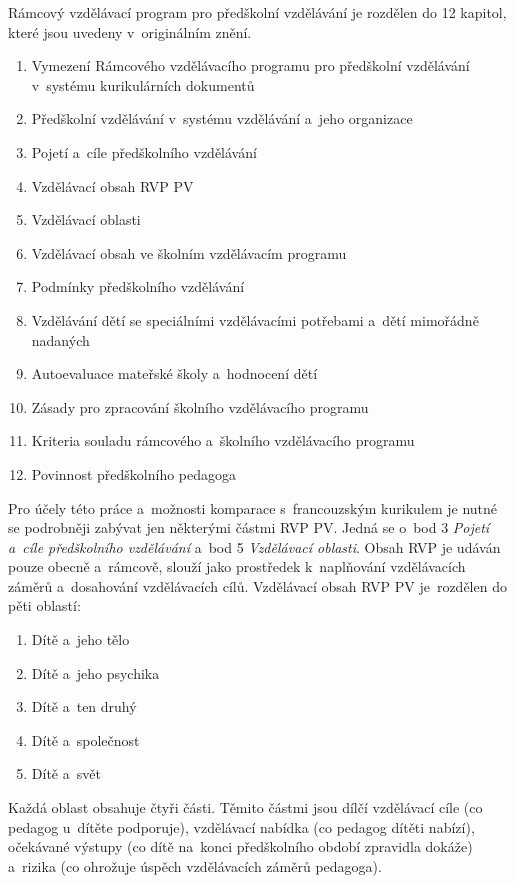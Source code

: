		\break \noindent
		Rámcový vzdělávací program pro předškolní vzdělávání je rozdělen do 12 kapitol, které jsou uvedeny v~originálním znění. \citep[s.~2]{RVP}
		\begin{enumerate}[1]
			\setlength\itemsep{-2mm}

			\item Vymezení Rámcového vzdělávacího programu pro předškolní vzdělávání v systému kurikulárních dokumentů
			\item Předškolní vzdělávání v systému vzdělávání a~jeho organizace
			\item Pojetí a~cíle předškolního vzdělávání
			\item Vzdělávací obsah RVP PV
			\item Vzdělávací oblasti
			\item Vzdělávací obsah ve školním vzdělávacím programu 
			\item Podmínky předškolního vzdělávání
			\item Vzdělávání dětí se speciálními vzdělávacími potřebami a~dětí mimořádně nadaných
			\item Autoevaluace mateřské školy a~hodnocení dětí
			\item Zásady pro zpracování školního vzdělávacího programu
			\item Kriteria souladu rámcového a~školního vzdělávacího programu
			\item Povinnost předškolního pedagoga
		\end{enumerate}

		Pro účely této práce a~možnosti komparace s francouzským kurikulem je nutné se podrobněji zabývat jen některými částmi RVP PV. Jedná se o~bod 3 \emph{Pojetí a~cíle předškolního vzdělávání} a~bod 5 \emph{Vzdělávací oblasti}.
		Obsah RVP je udáván pouze obecně a~rámcově, slouží jako prostředek k naplňování
		vzdělávacích záměrů a~dosahování vzdělávacích cílů. Vzdělávací obsah RVP PV je rozdělen do pěti oblastí:

		\begin{enumerate}[1]
			\setlength\itemsep{-2mm}
			\item Dítě a~jeho tělo
			\item Dítě a~jeho psychika
			\item Dítě a~ten druhý
			\item Dítě a~společnost
			\item Dítě a~svět
		\end{enumerate}

		Každá oblast obsahuje čtyři části. Těmito částmi jsou dílčí vzdělávací cíle (co pedagog u~dítěte podporuje), vzdělávací nabídka (co pedagog dítěti nabízí), očekávané výstupy (co dítě na konci předškolního období zpravidla dokáže) a~rizika (co ohrožuje úspěch vzdělávacích záměrů pedagoga).

